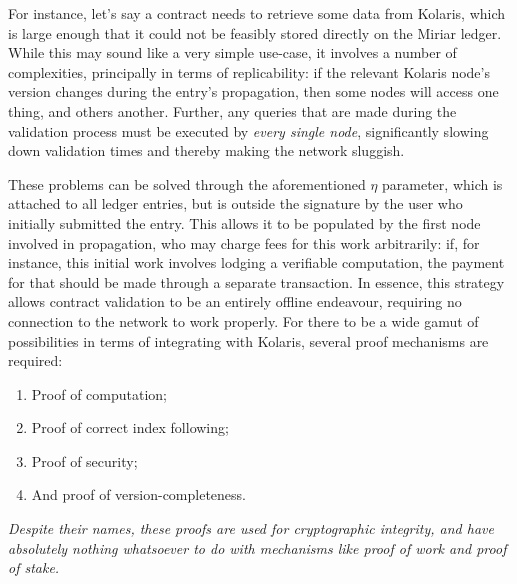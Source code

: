 \documentclass{extreport}
\begin{document}
For instance, let's say a contract needs to retrieve some data from Kolaris, which is large enough that it could not be feasibly stored directly on the Miriar ledger. While this may sound like a very simple use-case, it involves a number of complexities, principally in terms of replicability: if the relevant Kolaris node's version changes during the entry's propagation, then some nodes will access one thing, and others another. Further, any queries that are made during the validation process must be executed by \emph{every single node}, significantly slowing down validation times and thereby making the network sluggish.

These problems can be solved through the aforementioned \(\eta\) parameter, which is attached to all ledger entries, but is outside the signature by the user who initially submitted the entry. This allows it to be populated by the first node involved in propagation, who may charge fees for this work arbitrarily: if, for instance, this initial work involves lodging a verifiable computation, the payment for that should be made through a separate transaction. In essence, this strategy allows contract validation to be an entirely offline endeavour, requiring no connection to the network to work properly. For there to be a wide gamut of possibilities in terms of integrating with Kolaris, several proof mechanisms are required:

\begin{enumerate}
\item{Proof of computation;}
\item{Proof of correct index following;}
\item{Proof of security;}
\item{And proof of version-completeness.}
\end{enumerate}

\emph{Despite their names, these proofs are used for cryptographic integrity, and have absolutely nothing whatsoever to do with mechanisms like proof of work and proof of stake.}
\end{document}
